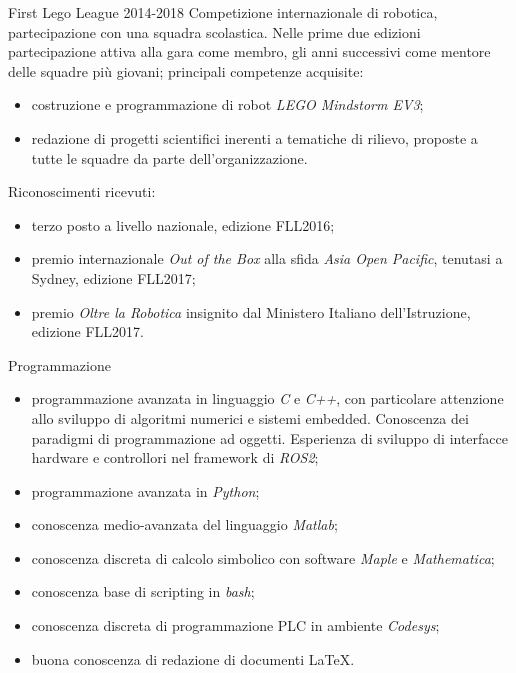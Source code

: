 \documentclass[10pt,a4paper]{report}
\begin{document}
    \begin{project}
        {First Lego League}
        {2014-2018}
        Competizione internazionale di robotica, partecipazione con una squadra scolastica. Nelle prime due edizioni partecipazione attiva alla gara come membro, gli anni successivi come mentore delle squadre più giovani; principali competenze acquisite:
        \begin{itemize}
            \item costruzione e programmazione di robot \textit{LEGO Mindstorm EV3};
            \item redazione di progetti scientifici inerenti a tematiche di rilievo, proposte a tutte le squadre da parte dell'organizzazione.
        \end{itemize}
        Riconoscimenti ricevuti:
        \begin{itemize}
            \item terzo posto a livello nazionale, edizione FLL2016;
            \item premio internazionale \textit{Out of the Box} alla sfida \textit{Asia Open Pacific}, tenutasi a Sydney, edizione FLL2017;
            \item premio \textit{Oltre la Robotica} insignito dal Ministero Italiano dell'Istruzione, edizione FLL2017.
        \end{itemize}
    \end{project}

    \begin{competence}{Programmazione}
        \begin{itemize}
            \item programmazione avanzata in linguaggio \textit{C} e \textit{C++}, con particolare attenzione allo sviluppo di algoritmi numerici e sistemi embedded. Conoscenza dei paradigmi di programmazione ad oggetti. Esperienza di sviluppo di interfacce hardware e controllori nel framework di \textit{ROS2};
            \item programmazione avanzata in \textit{Python};
            \item conoscenza medio-avanzata del linguaggio \textit{Matlab};
            \item conoscenza discreta di calcolo simbolico con software \textit{Maple} e \textit{Mathematica};
            \item conoscenza base di scripting in \textit{bash};
            \item conoscenza discreta di programmazione PLC in ambiente \textit{Codesys};
            \item buona conoscenza di redazione di documenti \LaTeX.
        \end{itemize}
    \end{competence}
\end{document}
